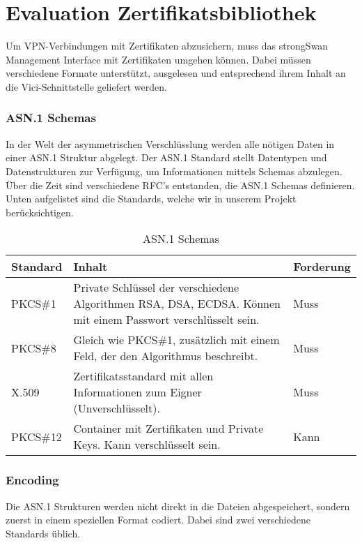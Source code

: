 \section{Evaluation Zertifikatsbibliothek}
Um VPN-Verbindungen mit Zertifikaten abzusichern, muss das strongSwan Management Interface mit Zertifikaten umgehen können. Dabei müssen verschiedene Formate unterstützt, ausgelesen und entsprechend ihrem Inhalt an die Vici-Schnittstelle geliefert werden.
\subsubsection{ASN.1 Schemas}
In der Welt der asymmetrischen Verschlüsslung werden alle nötigen Daten in einer ASN.1 Struktur abgelegt. Der ASN.1 Standard stellt Datentypen und Datenstrukturen zur Verfügung, um Informationen mittels Schemas abzulegen. Über die Zeit sind verschiedene RFC’s entstanden, die ASN.1 Schemas definieren. Unten aufgelistet sind die Standards, welche wir in unserem Projekt berücksichtigen. \\

\begin{table}[H]
\centering
    \begin{tabular}{|l|p{12cm}|l|}
    \hline
    \rowcolor{lightblue}
    Standard & Inhalt & Forderung   \\ \hline
	PKCS\#1	&	Private Schlüssel der verschiedene Algorithmen RSA, DSA, ECDSA. Können mit einem Passwort verschlüsselt sein.	& Muss \\ \hline	
		PKCS\#8	&	Gleich wie PKCS\#1, zusätzlich mit einem Feld, der den Algorithmus beschreibt.	& Muss \\ \hline	
		X.509	&	Zertifikatsstandard mit allen Informationen zum Eigner (Unverschlüsselt).	& Muss \\ \hline
		PKCS\#12	&	Container mit Zertifikaten und Private Keys. Kann verschlüsselt sein.	& Kann \\ \hline		
	\end{tabular}
    \caption[ASN.1 Schemas]{ASN.1 Schemas}
\end{table}

\subsubsection{Encoding}
Die ASN.1 Strukturen werden nicht direkt in die Dateien abgespeichert, sondern zuerst in einem speziellen Format codiert. Dabei sind zwei verschiedene Standards üblich.\\

